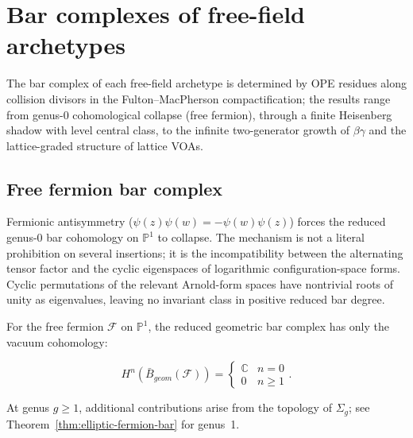 \section{Bar complexes of free-field archetypes}\label{sec:bar-complexes-free-fields}

The bar complex of each free-field archetype is determined by OPE
residues along collision divisors in the Fulton--MacPherson
compactification; the results range from genus-$0$ cohomological
collapse (free fermion), through a finite Heisenberg shadow with
level central class, to the infinite two-generator growth of
$\beta\gamma$ and the lattice-graded structure of lattice VOAs.

\subsection{Free fermion bar complex}

Fermionic antisymmetry
($\psi(z)\psi(w) = -\psi(w)\psi(z)$) forces the reduced
genus-$0$ bar cohomology on $\mathbb P^1$ to collapse. The mechanism
is not a literal prohibition on several insertions; it is the
incompatibility between the alternating tensor factor and the cyclic
eigenspaces of logarithmic configuration-space forms. Cyclic
permutations of the relevant Arnold-form spaces have nontrivial roots
of unity as eigenvalues, leaving no invariant class in positive
reduced bar degree.

\begin{theorem}
\label{thm:fermion-bar-complex-genus-0}
For the free fermion $\mathcal{F}$ on $\mathbb{P}^1$, the reduced
geometric bar complex has only the vacuum cohomology:

\[
H^n(\bar{B}_{geom}(\mathcal{F})) =
\begin{cases}
\mathbb{C} & n = 0\\
0 & n \geq 1
\end{cases}.
\]

At genus $g \geq 1$, additional contributions arise from the topology of $\Sigma_g$; see Theorem~\ref{thm:elliptic-fermion-bar} for genus~1.
\end{theorem}

